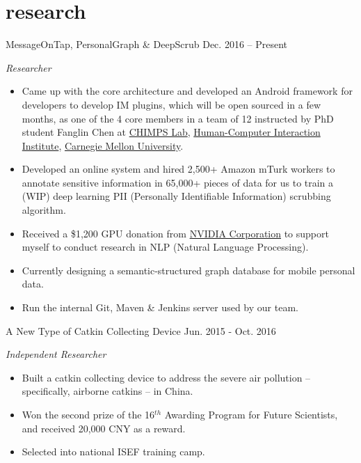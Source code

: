 \documentclass[hidelinks__VERSION__]{adamyi-cv} %
\begin{document}
\pagebreak



\section{research}

\begin{entrylist}


\entry
{MessageOnTap, PersonalGraph \& DeepScrub}
{Dec. 2016 -- Present}
{\emph{Researcher}
\begin{itemize}
\item Came up with the core architecture and developed an Android framework for developers to develop IM plugins, which will be open sourced in a few months, as one of the 4 core members in a team of 12 instructed by PhD student Fanglin Chen at \href{http://cmuchimps.org/}{CHIMPS Lab}, \href{https://www.hcii.cmu.edu/}{Human-Computer Interaction Institute}, \href{https://www.cmu.edu/}{Carnegie Mellon University}.
\item Developed an online system and hired 2,500+ Amazon mTurk workers to annotate sensitive information in 65,000+ pieces of data for us to train a (WIP) deep learning PII (Personally Identifiable Information) scrubbing algorithm.
\item Received a \$1,200 GPU donation from \href{https://www.nvidia.com/}{NVIDIA Corporation} to support myself to conduct research in NLP (Natural Language Processing).
\item Currently designing a semantic-structured graph database for mobile personal data.
\item Run the internal Git, Maven \& Jenkins server used by our team.
\end{itemize}}


\entry
{A New Type of Catkin Collecting Device}
{Jun. 2015 - Oct. 2016}
{\emph{Independent Researcher}
\begin{itemize}
\item Built a catkin collecting device to address the severe air pollution – specifically, airborne catkins – in China.
\item Won the second prize of the 16$^{th}$ Awarding Program for Future Scientists, and received 20,000 CNY as a reward.
\item Selected into national ISEF training camp.
\end{itemize}}


\end{entrylist}
\end{document}
